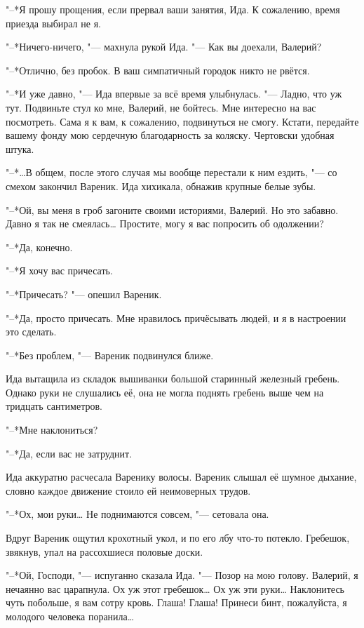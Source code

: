 "--*Я прошу прощения, если прервал ваши занятия, Ида.
К сожалению, время приезда выбирал не я.

"--*Ничего-ничего, "--- махнула рукой Ида.
"--- Как вы доехали, Валерий?

"--*Отлично, без пробок.
В ваш симпатичный городок никто не рвётся.

"--*И уже давно, "--- Ида впервые за всё время улыбнулась.
"--- Ладно, что уж тут.
Подвиньте стул ко мне, Валерий, не бойтесь.
Мне интересно на вас посмотреть.
Сама я к вам, к сожалению, подвинуться не смогу.
Кстати, передайте вашему фонду мою сердечную благодарность за коляску.
Чертовски удобная штука.

\asterism

"--*\dots{}В общем, после этого случая мы вообще перестали к ним ездить, "--- со смехом закончил Вареник.
Ида хихикала, обнажив крупные белые зубы.

"--*Ой, вы меня в гроб загоните своими историями, Валерий.
Но это забавно.
Давно я так не смеялась\dots{}
Простите, могу я вас попросить об одолжении?

"--*Да, конечно.

"--*Я хочу вас причесать.

"--*Причесать? "--- опешил Вареник.

"--*Да, просто причесать.
Мне нравилось причёсывать людей, и я в настроении это сделать.

"--*Без проблем, "--- Вареник подвинулся ближе.

Ида вытащила из складок вышиванки большой старинный железный гребень.
Однако руки не слушались её, она не могла поднять гребень выше чем на тридцать сантиметров.

"--*Мне наклониться?

"--*Да, если вас не затруднит.

Ида аккуратно расчесала Варенику волосы.
Вареник слышал её шумное дыхание, словно каждое движение стоило ей неимоверных трудов.

"--*Ох, мои руки\dots{}
Не поднимаются совсем, "--- сетовала она.

Вдруг Вареник ощутил крохотный укол, и по его лбу что-то потекло.
Гребешок, звякнув, упал на рассохшиеся половые доски.

"--*Ой, Господи, "--- испуганно сказала Ида.
"--- Позор на мою голову.
Валерий, я нечаянно вас царапнула.
Ох уж этот гребешок\dots{}
Ох уж эти руки\dots{}
Наклонитесь чуть побольше, я вам сотру кровь.
Глаша!
Глаша!
Принеси бинт, пожалуйста, я молодого человека поранила\dots{}


